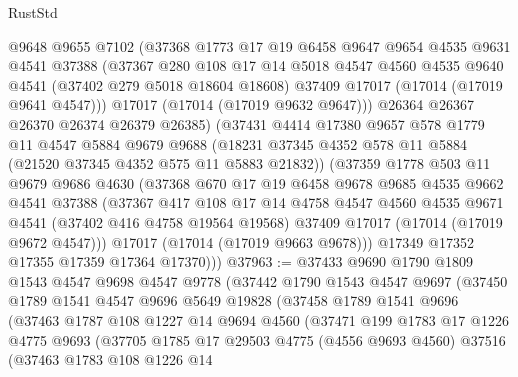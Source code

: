 \begin{lexlean}{RustStd}
\begin{coremodule}
        @9648
        @9655
        @7102
        (@37368
          @1773
          @17
          @19
          @6458
          @9647
          @9654
          @4535
          @9631
          @4541
          @37388
          (@37367
            @280
            @108
            @17
            @14
            @5018
            @4547
            @4560
            @4535
            @9640
            @4541
            (@37402 @279 @5018 @18604 @18608)
            @37409
            @17017
            (@17014 (@17019 @9641 @4547)))
          @17017
          (@17014 (@17019 @9632 @9647)))
        @26364
        @26367
        @26370
        @26374
        @26379
        @26385)
      (@37431
        @4414
        @17380
        @9657
        @578
        @1779
        @11
        @4547
        @5884
        @9679
        @9688
        (@18231 @37345 @4352 @578 @11 @5884 (@21520 @37345 @4352 @575 @11 @5883 @21832))
        (@37359
          @1778
          @503
          @11
          @9679
          @9686
          @4630
          (@37368
            @670
            @17
            @19
            @6458
            @9678
            @9685
            @4535
            @9662
            @4541
            @37388
            (@37367
              @417
              @108
              @17
              @14
              @4758
              @4547
              @4560
              @4535
              @9671
              @4541
              (@37402 @416 @4758 @19564 @19568)
              @37409
              @17017
              (@17014 (@17019 @9672 @4547)))
            @17017
            (@17014 (@17019 @9663 @9678)))
          @17349
          @17352
          @17355
          @17359
          @17364
          @17370)))
@37963 := @37433
    @9690
    @1790
    @1809
    @1543
    @4547
    @9698
    @4547
    @9778
    (@37442
      @1790
      @1543
      @4547
      @9697
      (@37450
        @1789
        @1541
        @4547
        @9696
        @5649
        @19828
        (@37458
          @1789
          @1541
          @9696
          (@37463
            @1787
            @108
            @1227
            @14
            @9694
            @4560
            (@37471
              @199
              @1783
              @17
              @1226
              @4775
              @9693
              (@37705
                @1785
                @17
                @29503
                @4775
                (@4556 @9693 @4560)
                @37516
                (@37463
                  @1783
                  @108
                  @1226
                  @14

\end{coremodule}
\end{lexlean}
